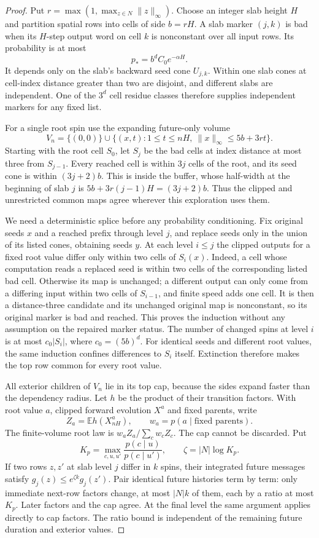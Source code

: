 \begin{proof}
Put $r=\max(1,\max_{z\in N}\|z\|_\infty)$. Choose an integer slab height $H$ and partition spatial rows into cells of side $b=rH$. A slab marker $(j,k)$ is bad when its $H$-step output word on cell $k$ is nonconstant over all input rows. Its probability is at most
\[
 p_*=b^dC_0e^{-\alpha H}.
\]
It depends only on the slab's backward seed cone $U_{j,k}$. Within one slab cones at cell-index distance greater than two are disjoint, and different slabs are independent. One of the $3^d$ cell residue classes therefore supplies independent markers for any fixed list.

For a single root spin use the expanding future-only volume
\[
 V_n=\{(0,0)\}\cup
 \{(x,t):1\le t\le nH,\ \|x\|_\infty\le5b+3rt\}.
\]
Starting with the root cell $S_0$, let $S_j$ be the bad cells at index distance at most three from $S_{j-1}$. Every reached cell is within $3j$ cells of the root, and its seed cone is within $(3j+2)b$. This is inside the buffer, whose half-width at the beginning of slab $j$ is $5b+3r(j-1)H=(3j+2)b$. Thus the clipped and unrestricted common maps agree wherever this exploration uses them.

We need a deterministic splice before any probability conditioning. Fix original seeds $x$ and a reached prefix through level $j$, and replace seeds only in the union of its listed cones, obtaining seeds $y$. At each level $i\le j$ the clipped outputs for a fixed root value differ only within two cells of $S_i(x)$. Indeed, a cell whose computation reads a replaced seed is within two cells of the corresponding listed bad cell. Otherwise its map is unchanged; a different output can only come from a differing input within two cells of $S_{i-1}$, and finite speed adds one cell. It is then a distance-three candidate and its unchanged original map is nonconstant, so its original marker is bad and reached. This proves the induction without any assumption on the repaired marker status. The number of changed spins at level $i$ is at most $c_0|S_i|$, where $c_0=(5b)^d$. For identical seeds and different root values, the same induction confines differences to $S_i$ itself. Extinction therefore makes the top row common for every root value.

All exterior children of $V_n$ lie in its top cap, because the sides expand faster than the dependency radius. Let $h$ be the product of their transition factors. With root value $a$, clipped forward evolution $X^a$ and fixed parents, write
\[
 Z_a=\mathbb E h(X^a_{nH}),\qquad w_a=p(a\mid\text{fixed parents}).
\]
The finite-volume root law is $w_aZ_a/\sum_cw_cZ_c$. The cap cannot be discarded. Put
\[
 K_p=\max_{c,u,u'}\frac{p(c\mid u)}{p(c\mid u')},\qquad
 \zeta=|N|\log K_p.
\]
If two rows $z,z'$ at slab level $j$ differ in $k$ spins, their integrated future messages satisfy $g_j(z)\le e^{\zeta k}g_j(z')$. Pair identical future histories term by term: only immediate next-row factors change, at most $|N|k$ of them, each by a ratio at most $K_p$. Later factors and the cap agree. At the final level the same argument applies directly to cap factors. The ratio bound is independent of the remaining future duration and exterior values.


\end{proof}
